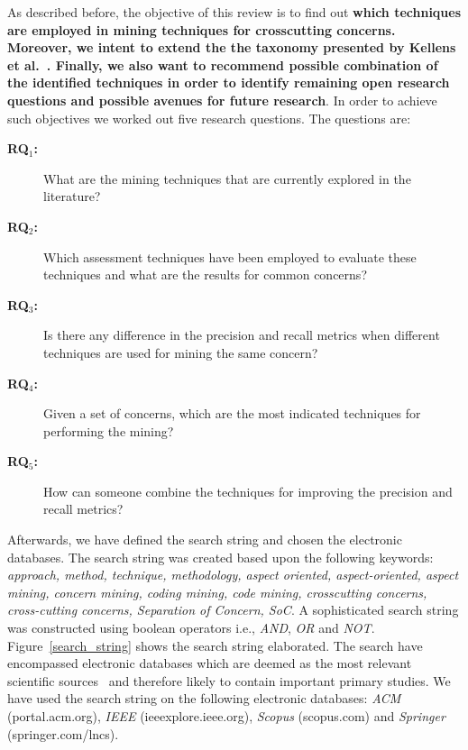 
As described before, the objective of this review is to find out \textbf{which techniques are employed in mining techniques for crosscutting concerns. Moreover, we intent to extend the the taxonomy presented by Kellens et al.~\cite{Kellens}. Finally, we also want to recommend possible combination of the identified techniques in order to identify remaining open research questions and possible avenues for future research}. In order to achieve such objectives we worked out five research questions. The questions are:

\begin{description}

\item[\textbf{RQ$_1$:}] What are the mining techniques that are currently explored in the literature?

\item[\textbf{RQ$_2$:}]  Which assessment techniques have been employed to evaluate these techniques and what are the results for common concerns?

\item[\textbf{RQ$_3$:}]  Is there any difference in the precision and recall metrics when different techniques are used for mining the same concern?

\item[\textbf{RQ$_4$:}] Given a set of concerns, which are the most indicated techniques for performing the mining?

\item[\textbf{RQ$_5$:}] How can someone combine the techniques for improving the precision and recall metrics?


\end{description}

Afterwards, we have defined the search string and chosen the electronic databases. The search string was created based upon the following keywords: \textit{approach, method, technique, methodology, aspect oriented, aspect-oriented, aspect mining, concern mining, coding mining, code mining, crosscutting concerns, cross-cutting concerns, Separation of Concern, SoC}. A sophisticated search string was constructed using boolean operators i.e., \textit{AND}, \textit{OR} and \textit{NOT}. Figure~\ref{search_string} shows the search string elaborated. The search have encompassed electronic databases which are deemed as the most relevant scientific sources~\cite{Dyba} and therefore likely to contain important primary studies. We have used the search string on the following electronic databases: \textit{ACM} (portal.acm.org), \textit{IEEE} (ieeexplore.ieee.org), \textit{Scopus} (scopus.com) and \textit{Springer} (springer.com/lncs). %

